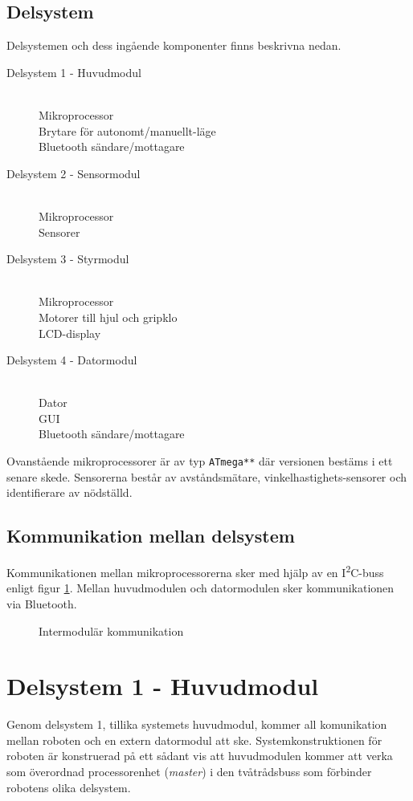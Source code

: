 \documentclass[11pt]{article}
\begin{document}
\begin{flushleft}
\subsection{Delsystem}
Delsystemen och dess ingående komponenter finns beskrivna nedan.
\begin{description}
	\item[Delsystem 1 - Huvudmodul] \hfill \\
	Mikroprocessor \\
	Brytare för autonomt/manuellt-läge \\
	Bluetooth\textsuperscript{\circledR} sändare/mottagare
	\item[Delsystem 2 - Sensormodul] \hfill \\
	Mikroprocessor \\
	Sensorer
	\item[Delsystem 3 - Styrmodul] \hfill \\
	Mikroprocessor \\
	Motorer till hjul och gripklo \\
	LCD-display
	\item[Delsystem 4 - Datormodul] \hfill \\
	Dator \\
	GUI \\
	Bluetooth\textsuperscript{\circledR} sändare/mottagare
\end{description}

Ovanstående mikroprocessorer är av typ \verb+ATmega**+ där versionen bestäms i ett senare skede. Sensorerna består av avståndsmätare, vinkelhastighets-sensorer och identifierare av nödställd. 
\subsection{Kommunikation mellan delsystem}
Kommunikationen mellan mikroprocessorerna sker med hjälp av en I\textsuperscript{2}C-buss enligt figur \ref{communication}. Mellan huvudmodulen och datormodulen sker kommunikationen via Bluetooth\textsuperscript{\circledR}.

\begin{figure}[htbp]
\noindent\resizebox{.97\textwidth}{!}{
		}
	\caption{Intermodulär kommunikation \label{communication}}
\end{figure}

\pagebreak
\section{Delsystem 1 - Huvudmodul}
\label{sec:huvudmodul}
Genom delsystem 1, tillika systemets huvudmodul, kommer all komunikation mellan roboten och en extern datormodul att ske. Systemkonstruktionen för roboten är konstruerad på ett sådant vis att huvudmodulen kommer att verka som överordnad processorenhet (\emph{master}) i den tvåtrådsbuss som förbinder robotens olika delsystem. 

\end{flushleft}
\end{document}
